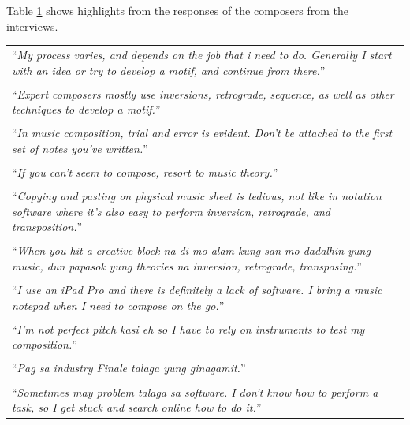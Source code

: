 		Table \ref{tab:composer-responses} shows highlights from the responses of the composers from the interviews.

		\begin{table} [H]
			 \label{tab:composer-responses}
			\vspace{0.20cm}   
			\begin{tabular}{|p{14cm}|}
				\hline
		  		``\textit{My process varies, and depends on the job that i need to do. Generally I start with an idea or try to develop a motif, and continue from there.}'' \\ 
		  		\\
		  		``\textit{Expert composers mostly use inversions, retrograde, sequence, as well as other techniques to develop a motif.}'' \\
		  		\\
		  		``\textit{In music composition, trial and error is evident. Don’t be attached to the first set of notes you’ve written.}'' \\
		  		\\
		  		``\textit{If you can't seem to compose, resort to music theory.}'' \\
		  		\\
		  		``\textit{Copying and pasting on physical music sheet is tedious, not like in notation software where it’s also easy to perform inversion, retrograde, and transposition.}'' \\
		  		\\
		  		``\textit{When you hit a creative block na di mo alam kung san mo dadalhin yung music, dun papasok yung theories na inversion, retrograde, transposing.}'' \\
		  		\\
		  		``\textit{I use an iPad Pro and there is definitely a lack of software. I bring a music notepad when I need to compose on the go.}'' \\
		  		\\
		  		``\textit{I'm not perfect pitch kasi eh so I have to rely on instruments to test my composition.}'' \\
		  		\\
		  		``\textit{Pag sa industry Finale talaga yung ginagamit.}'' \\
		  		\\
		  		``\textit{Sometimes may problem talaga sa software. I don’t know how to perform a task, so I get stuck and search online how to do it.}'' \\
		  		\hline
			\end{tabular}
		\end{table}


